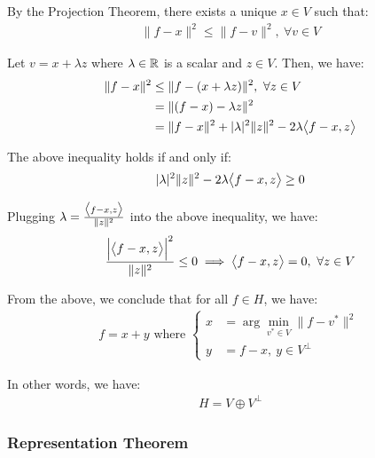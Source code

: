 \begin{proof*}
    By the Projection Theorem, there exists a unique $x\in V$ such that:
    \begin{align*}
        \|f - x \|^2 \le \|f - v\|^2, \ \forall v \in V
    \end{align*}

    \noindent Let $v = x + \lambda z$ where $\lambda\in\mathbb{R}$ is a scalar and $z \in V$. Then, we have:
    \begin{align*}
        \|f - x\|^2 &\le \|f - (x + \lambda z)\|^2, \ \forall z \in V \\
        &= \|(f - x) - \lambda z\|^2 \\
        &= \|f - x\|^2 + |\lambda|^2\|z\|^2 - 2\lambda \big<f-x, z\big>
    \end{align*}
    
    \noindent The above inequality holds if and only if:
    \begin{align*}
        |\lambda|^2\|z\|^2 - 2\lambda \big<f-x, z\big> \ge 0
    \end{align*}

    \noindent Plugging $\lambda = \frac{\big<f-x, z\big>}{\|z\|^2}$ into the above inequality, we have:
    \begin{align*}
        \frac{\Big| \big<f-x, z\big> \Big|^2}{\|z\|^2} \le 0 \implies \big<f-x, z\big> = 0, \ \forall z \in V
    \end{align*}

    \noindent From the above, we conclude that for all $f\in H$, we have:
    \begin{align*}
        f = x + y \text{ where } \begin{cases}
            x &= \arg\min_{v^*\in V}\|f - v^*\|^2 \\
            y &= f - x, \ y \in V^\perp
        \end{cases}
    \end{align*}

    \noindent In other words, we have:
    \begin{align*}
        H = V \oplus V^\perp
    \end{align*}
\end{proof*}


\subsubsection{Representation Theorem}
